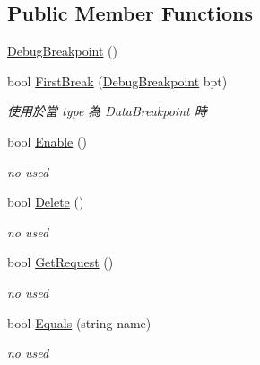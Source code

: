 \subsection*{Public Member Functions}
\begin{DoxyCompactItemize}
\item 
\hyperlink{classlib_wather_debugger_1_1_breakpoint_1_1_debug_breakpoint_ad3a7c630e422629711623f309f380637}{Debug\+Breakpoint} ()
\item 
bool \hyperlink{classlib_wather_debugger_1_1_breakpoint_1_1_debug_breakpoint_a4c6fcecbb0c3b85b416c3e1f51753303}{First\+Break} (\hyperlink{classlib_wather_debugger_1_1_breakpoint_1_1_debug_breakpoint}{Debug\+Breakpoint} bpt)
\begin{DoxyCompactList}\small\item\em 使用於當 type 為 Data\+Breakpoint 時 \end{DoxyCompactList}\item 
bool \hyperlink{classlib_wather_debugger_1_1_breakpoint_1_1_debug_breakpoint_ac550eeaf417e301db2795fc2fe026a58}{Enable} ()
\begin{DoxyCompactList}\small\item\em no used \end{DoxyCompactList}\item 
bool \hyperlink{classlib_wather_debugger_1_1_breakpoint_1_1_debug_breakpoint_a6c8e7dda30cd95a87b83ef781ddcc7c9}{Delete} ()
\begin{DoxyCompactList}\small\item\em no used \end{DoxyCompactList}\item 
bool \hyperlink{classlib_wather_debugger_1_1_breakpoint_1_1_debug_breakpoint_a7977ef022b210dc928947c5191857ba5}{Get\+Request} ()
\begin{DoxyCompactList}\small\item\em no used \end{DoxyCompactList}\item 
bool \hyperlink{classlib_wather_debugger_1_1_breakpoint_1_1_debug_breakpoint_a8b6daaa621d6547e846c15d848a8850e}{Equals} (string name)
\begin{DoxyCompactList}\small\item\em no used \end{DoxyCompactList}\end{DoxyCompactItemize}
